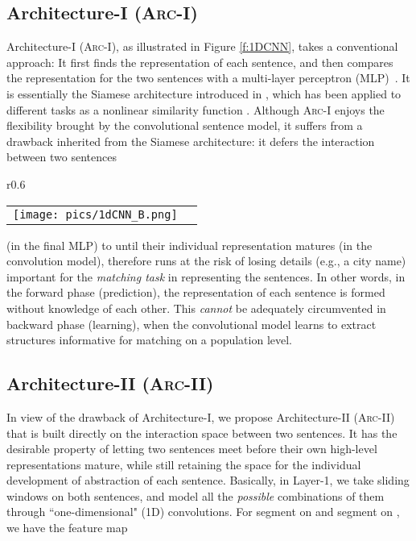 \documentclass{article} \usepackage{nips14submit_e,times}
\newcommand{\0}{\ensuremath{\mathbf{0}}}
\newcommand{\1}{\ensuremath{\mathbf{1}}}
\begin{document}
\subsection{Architecture-I (\textsc{Arc-I})} \vspace{-10pt}
Architecture-I (\textsc{Arc-I}),  as illustrated in Figure \ref{f:1DCNN}, takes a conventional approach: It first finds the representation of each sentence, and then compares the representation for the two sentences with a multi-layer perceptron (\textsc{MLP})~\cite{DeepAI}. It is essentially the Siamese architecture introduced in \cite{bordes2014semantic, cnn}, which has been applied to different tasks as a nonlinear similarity function \cite{Sun_2013_ICCV}. Although \textsc{Arc-I} enjoys the flexibility brought by the convolutional sentence model, it suffers from a drawback inherited from the Siamese architecture: it defers the interaction  between two sentences
\begin{wrapfigure}{r}{0.6\textwidth}
\begin{center}
\begin{tabular}[c]{cc}
     \texttt{[image: pics/1dCNN\_B.png]}
     \end{tabular}
\vspace{-10pt}
    \caption{Architecture-I for matching two sentences.} \vspace{-5pt}
    \label{f:1DCNN}
  \end{center}
\end{wrapfigure} (in the final MLP) to until their individual representation matures (in the convolution model), therefore runs at the risk of losing details (e.g., a city name) important for the \emph{matching task} in representing the sentences. In other words, in the forward phase (prediction), the representation of each sentence is formed without knowledge of each other. This \emph{cannot} be adequately circumvented in backward phase (learning), when the convolutional model learns to extract structures informative for matching on a population level.

\subsection{Architecture-II (\textsc{Arc-II})}  \vspace{-10pt}
In view of the drawback of Architecture-I, we propose Architecture-II (\textsc{Arc-II}) that is built directly on the interaction space between two sentences. It has the desirable property of letting two sentences meet before their own high-level representations mature, while still retaining the space for the individual development of abstraction of each sentence. Basically, in Layer-1, we take sliding windows on both sentences, and model all the \emph{possible} combinations of them through ``one-dimensional"  (1D) convolutions. For segment  on  and segment  on , we have the feature map
\end{document}
